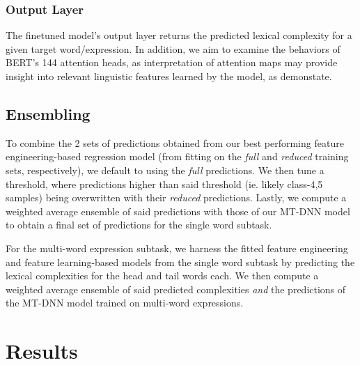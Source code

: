 \documentclass[11pt,a4paper]{article}
\begin{document}
\subsubsection{Output Layer}

The finetuned model's output layer returns the predicted lexical complexity for a given target word/expression. In addition, we aim to examine the behaviors of BERT's 144 attention heads, as interpretation of attention maps may provide insight into relevant linguistic features learned by the model, as \citep{DBLP:journals/corr/abs-1906-04341} demonstate.

\subsection{Ensembling}

To combine the 2 sets of predictions obtained from our best performing feature engineering-based regression model (from fitting on the \textit{full} and \textit{reduced} training sets, respectively), we default to using the \textit{full} predictions. We then tune a threshold, where predictions higher than said threshold (ie. likely class-4,5 samples) being overwritten with their \textit{reduced} predictions. Lastly, we compute a weighted average ensemble of said predictions with those of our MT-DNN model to obtain a final set of predictions for the single word subtask. 

For the multi-word expression subtask, we harness the fitted feature engineering and feature learning-based models from the single word subtask by predicting the lexical complexities for the head and tail words each. We then compute a weighted average ensemble of said predicted complexities \textit{and} the predictions of the MT-DNN model trained on multi-word expressions.

\section{Results}
\end{document}
